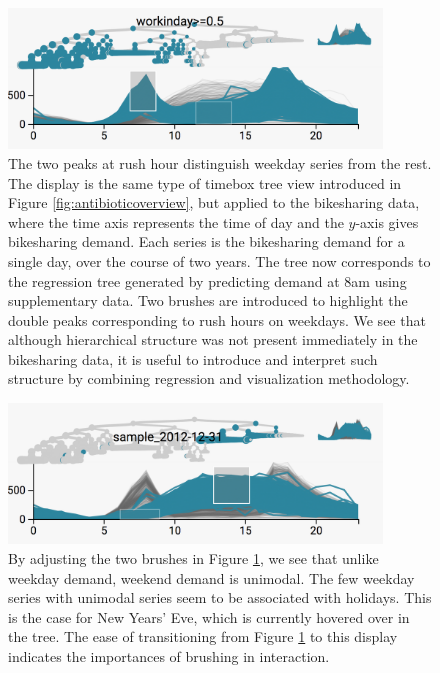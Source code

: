 \begin{figure}

{\centering \includegraphics[width=375px]{figure/treelapse/working}

}

\caption{The two peaks at rush hour distinguish weekday series from the rest.
  The display is the same type of timebox tree view introduced in Figure
  \ref{fig:antibioticoverview}, but applied to the bikesharing data, where the
  time axis represents the time of day and the $y$-axis gives bikesharing
  demand. Each series is the bikesharing demand for a single day, over the
  course of two years. The tree now corresponds to the regression tree generated
  by predicting demand at 8am using supplementary data. Two brushes are
  introduced to highlight the double peaks corresponding to rush hours on
  weekdays. We see that although hierarchical structure was not present
  immediately in the bikesharing data, it is useful to introduce and interpret
  such structure by combining regression and visualization methodology.
}\label{fig:working}
\end{figure}

\begin{figure}
  \centering
  \includegraphics[width=375px]{figure/treelapse/weekend}
    \caption{By adjusting the two brushes in Figure \ref{fig:working}, we see that
      unlike weekday demand, weekend demand is unimodal. The few weekday series with
      unimodal series seem to be associated with holidays. This is the case for New
      Years' Eve, which is currently hovered over in the tree. The ease of
      transitioning from Figure \ref{fig:working} to this display indicates the
      importances of brushing in interaction.}\label{fig:weekend}
\end{figure}


